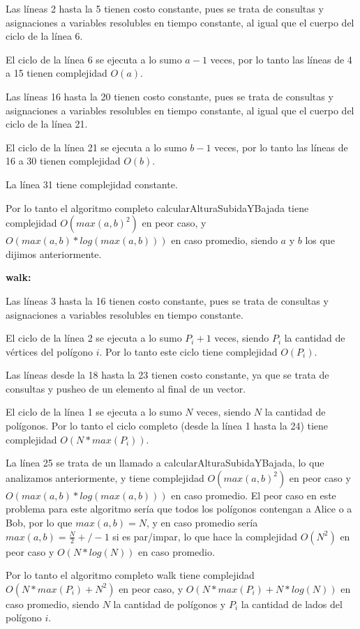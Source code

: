 Las líneas 2 hasta la 5 tienen costo constante, pues se trata de consultas y asignaciones a variables
resolubles en tiempo constante, al igual que el cuerpo del ciclo de la línea 6.

El ciclo de la línea 6 se ejecuta a lo sumo $a - 1$ veces, por lo tanto las líneas de 4 a 15 tienen
complejidad $O(a)$.

Las líneas 16 hasta la 20 tienen costo constante, pues se trata de consultas y asignaciones a variables
resolubles en tiempo constante, al igual que el cuerpo del ciclo de la línea 21.

El ciclo de la línea 21 se ejecuta a lo sumo $b - 1$ veces, por lo tanto las líneas de 16 a 30 tienen
complejidad $O(b)$.

La línea 31 tiene complejidad constante.

Por lo tanto el algoritmo completo calcularAlturaSubidaYBajada tiene complejidad $O(max(a,b)^2)$ en
peor caso, y $O(max(a,b)*log(max(a,b)))$ en caso promedio, siendo $a$ y $b$ los que dijimos
anteriormente.

\textbf{walk:}

Las líneas 3 hasta la 16 tienen costo constante, pues se trata de consultas y asignaciones a variables
resolubles en tiempo constante.

El ciclo de la línea 2 se ejecuta a lo sumo $P_i + 1$ veces, siendo $P_i$ la cantidad de vértices del
polígono $i$. Por lo tanto este ciclo tiene complejidad $O(P_i)$.

Las líneas desde la 18 hasta la 23 tienen costo constante, ya que se trata de consultas y pusheo de un
elemento al final de un vector.

El ciclo de la línea 1 se ejecuta a lo sumo $N$ veces, siendo $N$ la cantidad de polígonos.
Por lo tanto el ciclo completo (desde la línea 1 hasta la 24) tiene complejidad $O(N*max(P_i))$.

La línea 25 se trata de un llamado a calcularAlturaSubidaYBajada, lo que analizamos anteriormente, y
tiene complejidad $O(max(a,b)^2)$ en peor caso y $O(max(a,b)*log(max(a,b)))$ en caso promedio.
El peor caso en este problema para este algoritmo sería que todos los polígonos contengan a Alice o a Bob,
por lo que $max(a,b) = N$, y en caso promedio sería $max(a,b) = \frac{N}{2} +/- 1$ si es
par/impar, lo que hace la complejidad $O(N^2)$ en peor caso y $O(N*log(N))$ en caso promedio.

Por lo tanto el algoritmo completo walk tiene complejidad $O(N*max(P_i) + N^2)$ en peor caso,
y $O(N*max(P_i) + N*log(N))$ en caso promedio, siendo $N$ la cantidad de polígonos y
$P_i$ la cantidad de lados del polígono $i$.